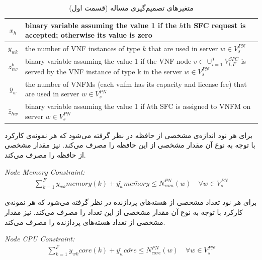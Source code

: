 \begin{table}[h!]
    \vspace{0.5cm}
    \caption{متغیرهای تصمیم‌گیری مساله (قسمت اول)}
    \begin{center}\begin{latin}\begin{tabular}{|c|p{10cm}|}
    \hline
    \(x_h\) & binary variable assuming the value 1 if the \(h\)th SFC request is accepted; otherwise its value is zero \\
    \hline
    \(y_{wk}\) & the number of VNF instances of type \(k\) that are used in server \(w \in V_s^{PN}\) \\
    \hline
    \(z^k_{vw}\) & binary variable assuming the value 1 if the VNF node \(v \in \cup_{i=1}^{T} V_{i, F}^{SFC}\) is served by the VNF instance of type k in the server \(w \in V_s^{PN}\) \\
    \hline
    \(\bar{y}_w\) & the number of VNFMs (each vnfm has its capacity and license fee) that are used in server \(w \in V_s^{PN} \) \\
    \hline
    \(\bar{z}_{hw}\) & binary variable assuming the value 1 if \(h\)th SFC is assigned to VNFM on server \(w \in V_s^{PN}\) \\
    \hline
    \end{tabular}\end{latin}\end{center}
\end{table}

برای هر نود اندازه‌ی مشخصی از حافظه 
در نظر گرفته می‌شود که هر نمونه‌ی کارکرد با توجه به نوع آن مقدار مشخصی از این حافظه را مصرف می‌کند.
 نیز مقدار مشخصی از حافظه را مصرف می‌کند.

\begin{latin}
    \textit{Node Memory Constraint:}
    \begin{align}
        \sum_{k=1}^F y_{wk} memory(k) + \bar{y_w} \bar{memory} \le N_{ram}^{PN}(w)
        \quad
        \forall w \in V_s^{PN}
    \end{align}
\end{latin}

برای هر نود تعداد مشخصی از هسته‌های پردازنده در نظر گرفته می‌شود که هر نمونه‌ی کارکرد با توجه به نوع آن مقدار مشخصی از این تعداد را مصرف می‌کند.
 نیز مقدار مشخصی از تعداد هسته‌های پردازنده را مصرف می‌کند.

\begin{latin}
    \textit{Node CPU Constraint:}
    \begin{align}
        \sum_{k=1}^F y_{wk} core(k) + \bar{y_w} \bar{core} \le N_{core}^{PN}(w)
        \quad
        \forall w \in V_s^{PN}
    \end{align}
\end{latin}

